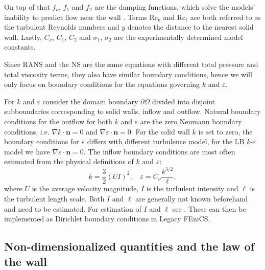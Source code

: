 On top of that \(f_\nu\), \(f_1\) and \(f_2\) are the damping functions, which solve the models' inability to predict flow near the wall \citep{greenshields_notes_2022}. Terms \(\text{Re}_k\) and \(\text{Re}_\ell\) are both referred to as the turbulent Reynolds numbers and \(y\) denotes the distance to the nearest solid wall. Lastly, \(C_\nu\), \(C_1\), \(C_2\) and \(\sigma_1\), \(\sigma_2\) are the experimentally determined model constants.

Since RANS and the NS are the same equations with different total pressure and total viscosity terms, they also have similar boundary conditions, hence we will only focus on boundary conditions for the equations governing \(k\) and \(\varepsilon\).

For \(k\) and \(\varepsilon\) consider the domain boundary \(\partial \Omega\) divided into disjoint subboundaries corresponding to solid walls, inflow and outflow. Natural boundary conditions for the outflow for both \(k\) and \(\varepsilon\) are the zero Neumann boundary conditions, i.e. \(\nabla k \cdot \mathbf{n} = 0\) and \(\nabla \varepsilon \cdot \mathbf{n} = 0\). For the solid wall \(k\) is set to zero, the boundary conditions for \(\varepsilon\) differs with different turbulence model, for the LB \(k\)-\(\varepsilon\) model we have \(\nabla \varepsilon \cdot \mathbf{n} = 0\). The inflow boundary conditions are most often estimated from the physical definitions of \(k\) and \(\varepsilon\):
\begin{equation*}\label{eq: definitions of k-e}
    k = \frac{3}{2} (U I)^2, 
    \quad
    \varepsilon = C_\nu \frac{k^{3/2}}{\ell},
\end{equation*}
where \(U\) is the average velocity magnitude, \(I\) is the turbulent intensity and \(\ell\) is the turbulent length scale. Both \(I\) and \(\ell\) are generally not known beforehand and need to be estimated. For estimation of \(I\) and \(\ell\) see \cite{greenshields_notes_2022}. These can then be implemented as Dirichlet boundary conditions in Legacy FEniCS.

\subsection{Non-dimensionalized quantities and the law of the wall}

